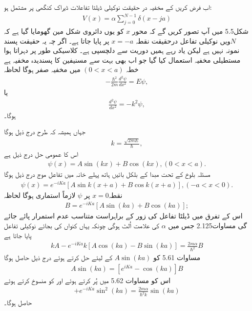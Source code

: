 اب فرض کریں کے مخفیہ در حقیقت نوکیلی ڈیلٹا تفاعلات ڈیراک کنگھی پر مشتمل ہو:
\begin{align}
	V(x) = \alpha\sum_{j=0}^{N-1}\delta(x-ja)
\end{align}
شکل\num{5.5} میں آپ تصور کریں گے  کہ محور $x$ کو یوں دائروی شکل مین گھومایا گیا ہے کہ $N$ویں نوکیلی تفاعل درحقیقت نقطہ \(x= -a\)  پر پایا جاتا ہے۔ اگر چہ یہ حقیقت پسند نمونہ نہیں ہے لیکن یاد رہے ہمیں دوریت سے دلچسپی ہے۔ کلاسیکی طور پر دہراتا ہوا مستطیلی مخفیہ استعمال کیا گیا جو اب بھی بہت سے مسنیفین کا پسندیدہ مخفیہ ہے خطہ \((0<x<a)\) میں مخفیہ صفر ہوگا لحاظہ 
\begin{align*}
	-\frac{\hbar^{2}}{2m}\frac{d^{2}\psi}{dx^{2}} = E\psi,
\end{align*}
یا
\begin{align*}
	\frac{d^{2}\psi}{dx^{2}} = -k^{2}\psi,
\end{align*}
ہوگا۔

جہاں ہمیشہ کہ طرح درج ذیل ہوگا 
\begin{align}
	k = \frac{\sqrt{2mE}}{\hbar},
\end{align}
اس کا عمومی حل درج ذیل ہے 
\begin{align}
	\psi(x) = A\sin(kx) + B\cos(kx), (0<x<a).
\end{align}
مسئلہ بلوخ کے تحت مبدا کے بلکل بائیں ہاتھ پہلے خانہ میں تفاعل موج درج ذیل ہوگا 
\begin{align}
	\psi(x) = e^{-iKa}[A\sin k(x+a) + B\cos k(x+a)], (-a<x<0). 
\end{align}
نقطہ\(x=0\) پر $\psi$ لازماً استماری ہوگا لحاظہ 
\begin{align}
	B = e^{-iKa}[A\sin(ka) + B\cos(ka)];
\end{align}
اس کے تفرق میں ڈیلٹا تفاعل کی زور کے براہراست متناسب عدم استمرار پائے جائے گی مساوات\num{2.125} جس میں $\alpha$ کی علامت اُلٹ ہوگی چونکہ یہاں کنواں کی بجائے نوکیلی تفاعل پایا جاتا ہے
\begin{align}
	kA - e^{-iKa}k[A\cos(ka) - B\sin(ka)] = \frac{2m\alpha}{\hbar^{2}}B
\end{align}
مساوات \num{5.61} کو \(A\sin(ka)\) کے لیئے حل کرتے ہوئے درج ذیل حاصل ہوگا 
\begin{align}
	A\sin(ka) = [e^{iKa}-\cos(ka)]B
\end{align}
اس کو مساوات \num{5.62} میں پُر کرتے ہوئے اور  کو منسوخ کرتے ہوئے 
\begin{align*}
	[e^{iKa}-\cos(ka)][1-e^{-iKa}\cos(ka)] + e^{-iKa}\sin^{2}(ka) = \frac{2m\alpha}{\hbar^{2}k}\sin(ka)
\end{align*}
حاصل ہوگا۔

